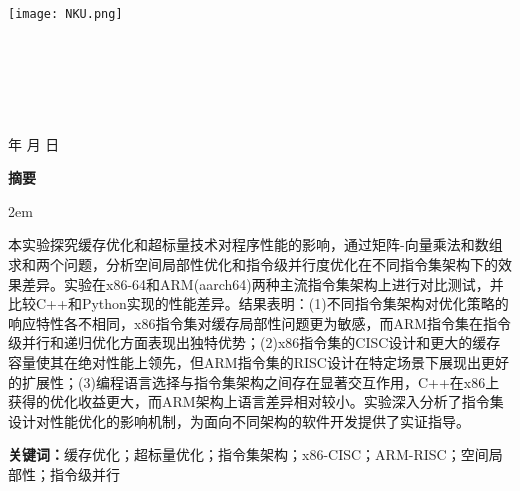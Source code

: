 \documentclass[a4paper,colorlinks=true,linkcolor=blue,urlcolor=blue,citecolor=green,bookmarks=true]{article}
\newenvironment{cnabstract}{
    \par\small
    \noindent\mbox{}\par\vspace{-\baselineskip}
    \par\songti\parindent 2em
    }
    {\par\vspace{1em}}
\begin{document}
\renewcommand{\contentsname}{目录}
\renewcommand{\appendixname}{附录}
\renewcommand{\appendixpagename}{附录}
\renewcommand{\refname}{参考文献} 
\renewcommand{\figurename}{图}
\renewcommand{\tablename}{表}
\renewcommand{\abstractname}{摘要}
\renewcommand{\today}{\number\year 年 \number\month 月 \number\day 日}

\renewcommand {\thefigure}{\thesection{}.\arabic{figure}}%
\renewcommand{\figurename}{图}
\renewcommand{\contentsname}{目录}  

\begin{titlepage}
    \begin{center}
    \texttt{[image: NKU.png]}\\[1cm]
    \vspace{20mm}
		\textbf{\huge\textbf{}}\\[0.5cm]
		\textbf{\huge{}}\\[2.3cm]
		\textbf{\Huge\textbf{}}

		\vspace{\fill}
    
    \centering
    \textsc{\LARGE {}}\\[0.5cm]
    \textsc{\LARGE {}}\\[0.5cm]
    \textsc{\LARGE {}}\\[0.5cm]
    
    \vfill
    {\Large \today}
    \end{center}
\end{titlepage}

\clearpage
{}
\begin{center}{\songti\bfseries{摘\quad 要}}\end{center}\par\vspace{0.5em}
\begin{cnabstract}
本实验探究缓存优化和超标量技术对程序性能的影响，通过矩阵-向量乘法和数组求和两个问题，分析空间局部性优化和指令级并行度优化在不同指令集架构下的效果差异。实验在x86-64和ARM(aarch64)两种主流指令集架构上进行对比测试，并比较C++和Python实现的性能差异。结果表明：(1)不同指令集架构对优化策略的响应特性各不相同，x86指令集对缓存局部性问题更为敏感，而ARM指令集在指令级并行和递归优化方面表现出独特优势；(2)x86指令集的CISC设计和更大的缓存容量使其在绝对性能上领先，但ARM指令集的RISC设计在特定场景下展现出更好的扩展性；(3)编程语言选择与指令集架构之间存在显著交互作用，C++在x86上获得的优化收益更大，而ARM架构上语言差异相对较小。实验深入分析了指令集设计对性能优化的影响机制，为面向不同架构的软件开发提供了实证指导。

\vspace{1em}
\noindent\textbf{关键词：}缓存优化；超标量优化；指令集架构；x86-CISC；ARM-RISC；空间局部性；指令级并行
\end{cnabstract}
\end{document}
